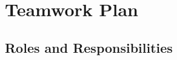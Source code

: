 \section{Teamwork Plan}
\label{sec:teamwork-plan}
\subsection{Roles and Responsibilities}
\label{subsec:roles-and-responsibilities}

\vspace{1em}

\centering
\renewcommand{\arraystretch}{1.75}


